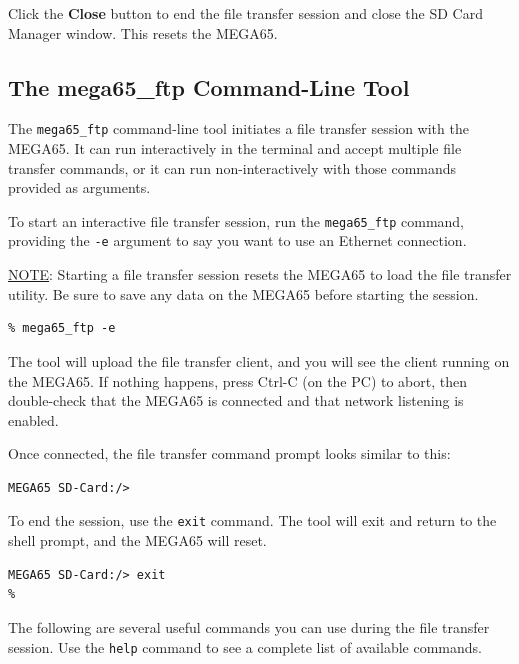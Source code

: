 Click the {\bf Close} button to end the file transfer session and close the SD Card Manager window. This resets the MEGA65.

\subsection{The mega65\_ftp Command-Line Tool}

The {\tt mega65\_ftp} command-line tool initiates a file transfer session with the MEGA65. It can run interactively in the terminal and accept multiple file transfer commands, or it can run non-interactively with those commands provided as arguments.

To start an interactive file transfer session, run the {\tt mega65\_ftp} command, providing the {\tt -e} argument to say you want to use an Ethernet connection.

\underline{NOTE}: Starting a file transfer session resets the MEGA65 to load the file transfer utility. Be sure to save any data on the MEGA65 before starting the session.

\begin{verbatim}
% mega65_ftp -e
\end{verbatim}

The tool will upload the file transfer client, and you will see the client running on the MEGA65. If nothing happens, press Ctrl-C (on the PC) to abort, then double-check that the MEGA65 is connected and that network listening is enabled.

Once connected, the file transfer command prompt looks similar to this:

\begin{verbatim}
MEGA65 SD-Card:/>
\end{verbatim}

To end the session, use the {\tt exit} command. The tool will exit and return to the shell prompt, and the MEGA65 will reset.

\begin{verbatim}
MEGA65 SD-Card:/> exit
%
\end{verbatim}

The following are several useful commands you can use during the file transfer session. Use the {\tt help} command to see a complete list of available commands.

